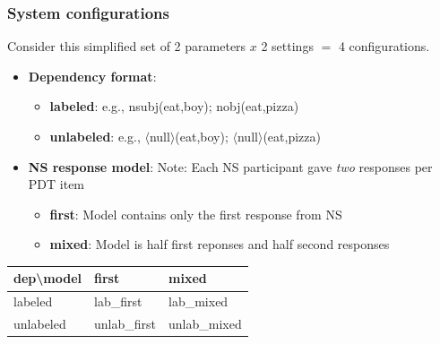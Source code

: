 \documentclass[xcolor={dvipsnames}]{beamer}
\begin{document}
\begin{frame}
\frametitle{System configurations}
\small

Consider this simplified set of 2 parameters $x$ 2 settings $=$ 4 configurations.
\medskip

\begin{itemize}
\item \textbf{Dependency format}:
\begin{itemize}
\item \textbf{labeled}: e.g., nsubj(eat,boy); nobj(eat,pizza)
\item \textbf{unlabeled}: e.g., $\langle$null$\rangle$(eat,boy); $\langle$null$\rangle$(eat,pizza)
\end{itemize}
\smallskip

\item \textbf{NS response model}:
Note: Each NS participant gave \textit{two} responses per PDT item
\begin{itemize}
\item \textbf{first}: Model contains only the first response from NS
\item \textbf{mixed}: Model is half first reponses and half second responses
\end{itemize}
\end{itemize}
\begin{table}[htb!]
\small
\begin{center}
\begin{tabular}{|l||l|l|}
\hline
dep\textbackslash model & first & mixed \\
\hline
\hline
labeled & lab\_first & lab\_mixed \\
\hline
unlabeled & unlab\_first & unlab\_mixed \\
\hline
\end{tabular}
\end{center}
\end{table}

\end{frame}
\end{document}

